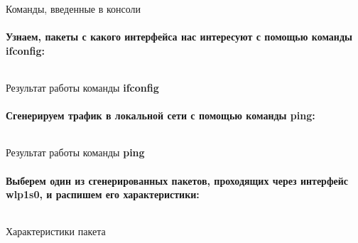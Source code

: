 \begin{code}
	\inputminted[breaklines=true, xleftmargin=1em, linenos, frame=single, framesep=10pt, fontsize=\footnotesize, firstline=1, lastline=33]{haskell}{fig/wireshark.bash}
	\caption{Команды, введенные в консоли}
\end{code}

\newpage

\paragraph{Узнаем, пакеты с какого интерфейса нас интересуют с помощью команды ifconfig:}

\begin{code}
	\inputminted[breaklines=true, xleftmargin=1em, linenos, frame=single, framesep=10pt, fontsize=\footnotesize, firstline=1, lastline=33]{haskell}{fig/ifconfig.bash}
	\caption{Результат работы команды \textbf{ifconfig}}
\end{code}

\paragraph{Сгенерируем трафик в локальной сети с помощью команды ping:}

\begin{code}
	\inputminted[breaklines=true, xleftmargin=1em, linenos, frame=single, framesep=10pt, fontsize=\footnotesize, firstline=1, lastline=33]{haskell}{fig/ping1.bash}
	\caption{Результат работы команды \textbf{ping}}
\end{code}

\newpage

\paragraph{Выберем один из сгенерированных пакетов, проходящих через интерфейс wlp1s0, и распишем его характеристики:}

\begin{code}
	\inputminted[breaklines=true, xleftmargin=1em, linenos, frame=single, framesep=10pt, fontsize=\footnotesize, firstline=1, lastline=33]{haskell}{fig/packet1.bash}
	\caption{Характеристики пакета}
\end{code}

